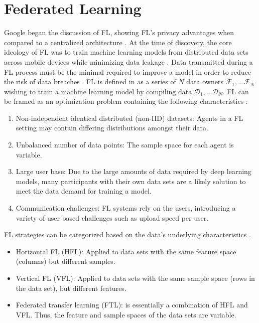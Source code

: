 \section{Federated Learning}
Google began the discussion of FL, showing FL's privacy advantages when compared
to a centralized architecture \cite{Konecny2015, BrendanMcMahan2017a, McMahan2016FederatedLO}.
At the time of discovery, the core ideology of FL was to train machine learning models from
distributed data sets across mobile devices while minimizing data leakage \cite{McMahan2016FederatedLO}.
Data transmitted during a FL process must be the minimal required to improve a model in order to
reduce the risk of data breaches \cite{BrendanMcMahan2017a}.  FL is defined in \cite{Yang2019a, IntelAI19}
as a series of $N$ data owners ${\mathcal{F}_1,...\mathcal{F}_N}$ wishing to train a machine learning
model by compiling data ${\mathcal{D}_1,...\mathcal{D}_N}$.  FL can be framed as an optimization
problem containing the following characteristics \cite{IntelAI19}:
\begin{enumerate}
    \item Non-independent identical distributed (non-IID) datasets: Agents in a FL setting
    may contain differing distributions amongst their data.
    \item Unbalanced number of data points: The sample space for each agent is variable.
    \item Large user base: Due to the large amounts of data required by deep learning
    models, many participants with their own data sets are a likely solution to meet
    the data demand for training a model.
    \item Communication challenges: FL systems rely on the users, introducing a variety
    of user based challenges such as upload speed per user.
\end{enumerate}

FL strategies can be categorized based on the data's underlying characteristics
\cite{Yang2019a, IntelAI19}.

\begin{itemize}
    \item Horizontal FL (HFL): Applied to data sets with the same feature space (columns)
    but different samples.
    \item Vertical FL (VFL): Applied to data sets with the same sample space (rows in the
    data set), but different features.
    \item Federated transfer learning (FTL): is essentially a combination of HFL and
    VFL.  Thus, the feature and sample spaces of the data
    sets are variable.
\end{itemize}

